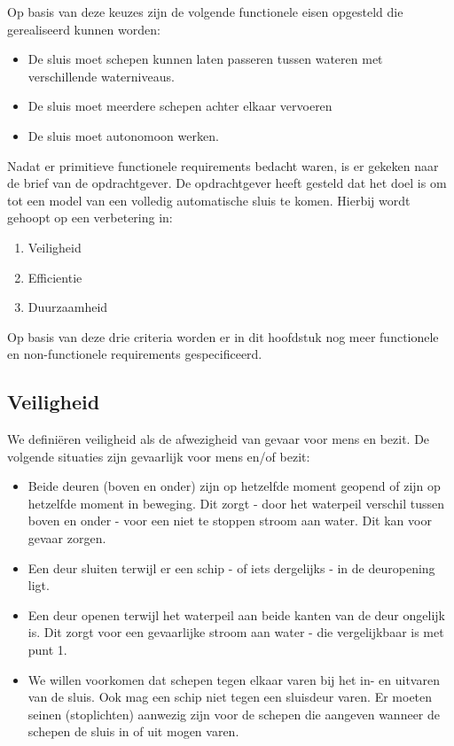 \documentclass{article} %
\begin{document}
Op basis van deze keuzes zijn de volgende functionele eisen opgesteld die gerealiseerd kunnen worden:

\begin{itemize}
    \item De sluis moet schepen kunnen laten passeren tussen wateren met verschillende waterniveaus.
    \item De sluis moet meerdere schepen achter elkaar vervoeren
    \item De sluis moet autonomoon werken.
\end{itemize}

Nadat er primitieve functionele requirements bedacht waren, is er gekeken naar de brief van de opdrachtgever. De opdrachtgever heeft gesteld dat het doel is om tot een model van een volledig automatische sluis te komen. Hierbij wordt gehoopt op een verbetering in:
\begin{enumerate}
    \item Veiligheid
    \item Efficientie
    \item Duurzaamheid
\end{enumerate}

Op basis van deze drie criteria worden er in dit hoofdstuk nog meer functionele en non-functionele requirements gespecificeerd.
\newpage

\subsection{Veiligheid}
We definiëren veiligheid als de afwezigheid van gevaar voor mens en bezit. De volgende situaties zijn gevaarlijk voor mens en/of bezit:
\begin{itemize}
    \item Beide deuren (boven en onder) zijn op hetzelfde moment geopend of zijn op hetzelfde moment in beweging. Dit zorgt - door het waterpeil verschil tussen boven en onder - voor een niet te stoppen stroom aan water. Dit kan voor gevaar zorgen.
    \item Een deur sluiten terwijl er een schip - of iets dergelijks - in de deuropening ligt.
    \item Een deur openen terwijl het waterpeil aan beide kanten van de deur ongelijk is. Dit zorgt voor een gevaarlijke stroom aan water - die vergelijkbaar is met punt 1.
    \item We willen voorkomen dat schepen tegen elkaar varen bij het in- en uitvaren van de sluis. Ook mag een schip niet tegen een sluisdeur varen. Er moeten seinen (stoplichten) aanwezig zijn voor de schepen die aangeven wanneer de schepen de sluis in of uit mogen varen.
\end{itemize}
\end{document}
